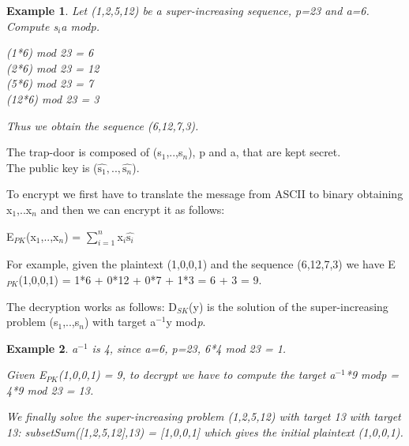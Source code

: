 \documentclass[a4paper, 12pt]{report}
\newtheorem{example}{\textbf{Example}}
\begin{document}
\begin{example}
	Let (1,2,5,12) be a super-increasing sequence, p=23 and a=6. Compute s$_i$a mod\textit{p}.
	\begin{center}
		(1*6) mod 23 = 6\\
		(2*6) mod 23 = 12\\
		(5*6) mod 23 = 7\\
		(12*6) mod 23 = 3
	\end{center}
	Thus we obtain the sequence (6,12,7,3).
\end{example}

The trap-door is composed of (s$_1$,..,s$_n$), p and a, that are kept secret.\\
The public key is ($\hat{\text{s}_1},..,\hat{\text{s}_n}$).

To encrypt we first have to translate the message from ASCII to binary obtaining x$_1$,..x$_n$ and then we can encrypt it as follows:
\begin{center}
	E$_{PK}$(x$_1$,..,x$_n$) = $\sum_{i=1}^{n}$x$_i\hat{\text{s}_i}$
\end{center}

For example, given the plaintext (1,0,0,1) and the sequence (6,12,7,3) we have E$_{PK}$(1,0,0,1) = 1*6 + 0*12 + 0*7 + 1*3 = 6 + 3 = 9.

The decryption works as follows: D$_{SK}$(y) is the solution of the super-increasing problem (s$_1$,..,s$_n$) with target a$^{-1}$y mod\textit{p}.
\begin{example}
	a$^{-1}$ is 4, since a=6, p=23, 6*4 mod 23 = 1.
	
	Given E$_{PK}$(1,0,0,1) = 9, to decrypt we have to compute the target a$^{-1}$*9 mod\textit{p} = 4*9 mod 23 = 13.
	
	We finally solve the super-increasing problem (1,2,5,12) with target 13 with target 13: subsetSum([1,2,5,12],13) = [1,0,0,1] which gives the initial plaintext (1,0,0,1).
\end{example} 
\end{document}

